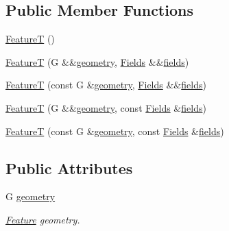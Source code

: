 \subsection*{Public Member Functions}
\begin{DoxyCompactItemize}
\item 
\hyperlink{structdg_1_1deepcore_1_1vector_1_1_feature_t_a41874b8b106bf9b69775d53b54ed3c1b}{FeatureT} ()
\item 
\hyperlink{structdg_1_1deepcore_1_1vector_1_1_feature_t_ae7b578e2d238e4d637995be45b01d733}{FeatureT} (G \&\&\hyperlink{structdg_1_1deepcore_1_1vector_1_1_feature_t_a4bfe214fd6ded7e74affd4246fe7f960}{geometry}, \hyperlink{group___vector_module_gabeca0d4b0cbea4335ae890255ca59128}{Fields} \&\&\hyperlink{classdg_1_1deepcore_1_1vector_1_1_feature_a932740031038833666cd2afd1ada92f4}{fields})
\item 
\hyperlink{structdg_1_1deepcore_1_1vector_1_1_feature_t_a8d3dfcfe50bedc93bbe88dfddbdcf8a2}{FeatureT} (const G \&\hyperlink{structdg_1_1deepcore_1_1vector_1_1_feature_t_a4bfe214fd6ded7e74affd4246fe7f960}{geometry}, \hyperlink{group___vector_module_gabeca0d4b0cbea4335ae890255ca59128}{Fields} \&\&\hyperlink{classdg_1_1deepcore_1_1vector_1_1_feature_a932740031038833666cd2afd1ada92f4}{fields})
\item 
\hyperlink{structdg_1_1deepcore_1_1vector_1_1_feature_t_a992f343f01c3b49daf3c5ca33b309859}{FeatureT} (G \&\&\hyperlink{structdg_1_1deepcore_1_1vector_1_1_feature_t_a4bfe214fd6ded7e74affd4246fe7f960}{geometry}, const \hyperlink{group___vector_module_gabeca0d4b0cbea4335ae890255ca59128}{Fields} \&\hyperlink{classdg_1_1deepcore_1_1vector_1_1_feature_a932740031038833666cd2afd1ada92f4}{fields})
\item 
\hyperlink{structdg_1_1deepcore_1_1vector_1_1_feature_t_a703766e00a89de30f9149f5e8c25133f}{FeatureT} (const G \&\hyperlink{structdg_1_1deepcore_1_1vector_1_1_feature_t_a4bfe214fd6ded7e74affd4246fe7f960}{geometry}, const \hyperlink{group___vector_module_gabeca0d4b0cbea4335ae890255ca59128}{Fields} \&\hyperlink{classdg_1_1deepcore_1_1vector_1_1_feature_a932740031038833666cd2afd1ada92f4}{fields})
\end{DoxyCompactItemize}
\subsection*{Public Attributes}
\begin{DoxyCompactItemize}
\item 
G \hyperlink{structdg_1_1deepcore_1_1vector_1_1_feature_t_a4bfe214fd6ded7e74affd4246fe7f960}{geometry}
\begin{DoxyCompactList}\small\item\em \hyperlink{classdg_1_1deepcore_1_1vector_1_1_feature}{Feature} geometry. \end{DoxyCompactList}\end{DoxyCompactItemize}
